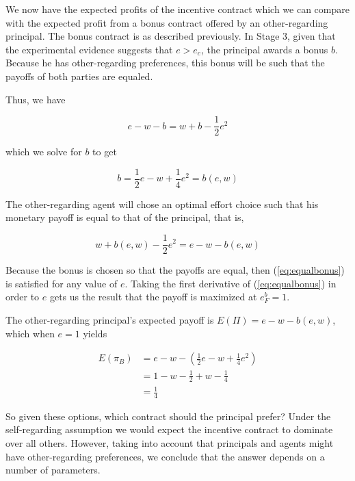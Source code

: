 \documentclass[12pt]{article}
\begin{document}
We now have the expected profits of the incentive contract which we can compare with the expected profit from a bonus contract offered by an other-regarding principal. The bonus contract is as described previously. In Stage 3, given that the experimental evidence suggests that $e>e_c$, the principal awards a bonus $b$. Because he has other-regarding preferences, this bonus will be such that the payoffs of both parties are equaled. 

Thus, we have

\begin{equation}
e - w - b = w + b - \frac{1}{2} e^2
\end{equation} 

\noindent
which we solve for $b$ to get

\begin{equation}
	b = \frac{1}{2} e - w + \frac{1}{4}e^2 = b\left(e,w\right)
\end{equation}

The other-regarding agent will chose an optimal effort choice such that his monetary payoff is equal to that of the principal, that is, 

\begin{equation}\label{eq:equalbonus}
	w + b(e,w) - \frac{1}{2}e^2 = e - w - b(e,w)
\end{equation}

Because the bonus is chosen so that the payoffs are equal, then (\ref{eq:equalbonus}) is satisfied for any value of $e$. Taking the first derivative of (\ref{eq:equalbonus}) in order to $e$ gets us the result that the payoff is maximized at $e^b_F = 1$. 

The other-regarding principal's expected payoff is $E\left(\Pi\right) = e - w - b(e,w)$, which when $e=1$ yields

\begin{equation}
\begin{split}
E\left(\pi_B\right) & = e - w - \left( \frac{1}{2}e - w + \frac{1}{4}e^2 \right)\\
& = 1 - w - \frac{1}{2} + w - \frac{1}{4}\\
& = \frac{1}{4} 
\end{split}
\end{equation}

So given these options, which contract should the principal prefer? Under the self-regarding assumption we would expect the incentive contract to dominate over all others. However, taking into account that principals and agents might have other-regarding preferences, we conclude that the answer depends on a number of parameters. 
\end{document}
